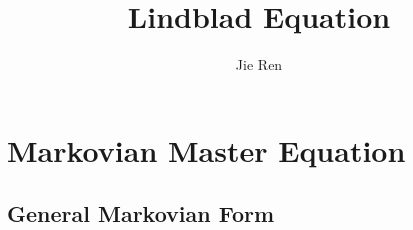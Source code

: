\documentclass[aps,prb,superscriptaddress,nofootinbib]{revtex4}
\begin{document}
\title{Lindblad Equation}
\author{Jie Ren}



\maketitle


\tableofcontents

\section{Markovian Master Equation}

\subsection{General Markovian Form}
\end{document}

